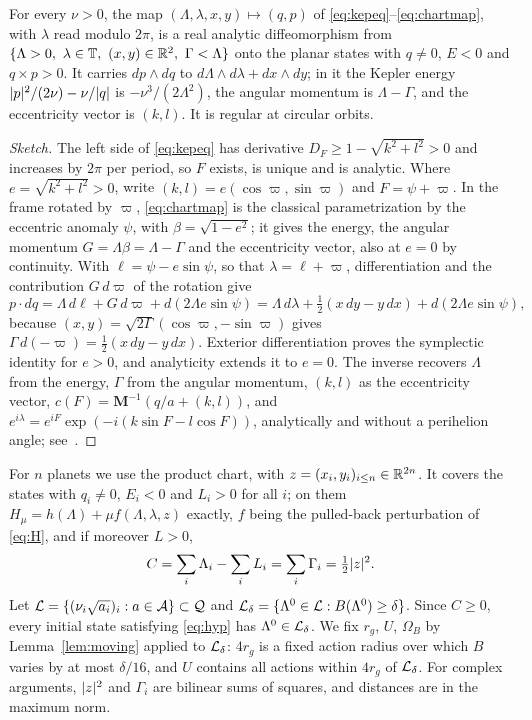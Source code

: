 \begin{lemma}
\label{lem:chart}
For every $\nu>0$, the map $(\Lambda,\lambda,x,y)\mapsto(q,p)$ of \eqref{eq:kepeq}--\eqref{eq:chartmap}, with $\lambda$ read modulo $2\pi$, is a real analytic diffeomorphism from $\{\Lambda>0,\ \lambda\in\T,\ (x,y)\in\R^2,\ \Gamma<\Lambda\}$ onto the planar states with $q\ne0$, $E<0$ and $q\times p>0$. It carries $dp\wedge dq$ to $d\Lambda\wedge d\lambda+dx\wedge dy$; in it the Kepler energy $\lvert p\rvert^2/(2\nu)-\nu/\lvert q\rvert$ is $-\nu^3/(2\Lambda^2)$, the angular momentum is $\Lambda-\Gamma$, and the eccentricity vector is $(k,l)$. It is regular at circular orbits.
\end{lemma}

\begin{proof}[Sketch]
The left side of \eqref{eq:kepeq} has derivative $D_F\ge1-\sqrt{k^2+l^2}>0$ and increases by $2\pi$ per period, so $F$ exists, is unique and is analytic. Where $e=\sqrt{k^2+l^2}>0$, write $(k,l)=e(\cos\varpi,\sin\varpi)$ and $F=\psi+\varpi$. In the frame rotated by $\varpi$, \eqref{eq:chartmap} is the classical parametrization by the eccentric anomaly $\psi$, with $\beta=\sqrt{1-e^2}$; it gives the energy, the angular momentum $G=\Lambda\beta=\Lambda-\Gamma$ and the eccentricity vector, also at $e=0$ by continuity. With $\ell=\psi-e\sin\psi$, so that $\lambda=\ell+\varpi$, differentiation and the contribution $G\,d\varpi$ of the rotation give
\[
p\cdot dq=\Lambda\,d\ell+G\,d\varpi+d(2\Lambda e\sin\psi)=\Lambda\,d\lambda+\tfrac12(x\,dy-y\,dx)+d(2\Lambda e\sin\psi),
\]
because $(x,y)=\sqrt{2\Gamma}(\cos\varpi,-\sin\varpi)$ gives $\Gamma\,d(-\varpi)=\frac12(x\,dy-y\,dx)$. Exterior differentiation proves the symplectic identity for $e>0$, and analyticity extends it to $e=0$. The inverse recovers $\Lambda$ from the energy, $\Gamma$ from the angular momentum, $(k,l)$ as the eccentricity vector, $c(F)=\mathbf M^{-1}(q/a+(k,l))$, and $e^{i\lambda}=e^{iF}\exp(-i(k\sin F-l\cos F))$, analytically and without a perihelion angle; see~\cite{KAMnotes}.
\end{proof}

For $n$ planets we use the product chart, with $z=(x_i,y_i)_{i\le n}\in\mathbb{R}^{2n}$. It covers the states with $q_i\ne0$, $E_i<0$ and $L_i>0$ for all $i$; on them $H_\mu=h(\Lambda)+\mu f(\Lambda,\lambda,z)$ exactly, $f$ being the pulled-back perturbation of \eqref{eq:H}, and if moreover $L>0$,
\begin{equation}
\label{eq:Cz}
C=\sum_i\Lambda_i-\sum_iL_i=\sum_i\Gamma_i=\tfrac12\lvert z\rvert^2.
\end{equation}
Let $\mathcal{L}=\{(\nu_i\sqrt{a_i})_i:a\in\mathcal{A}\}\subset\mathcal{Q}$ and $\mathcal{L}_\delta=\{\Lambda^0\in\mathcal{L}:B(\Lambda^0)\ge\delta\}$. Since $C\ge0$, every initial state satisfying \eqref{eq:hyp} has $\Lambda^0\in\mathcal{L}_\delta$. We fix $r_g$, $U$, $\Omega_B$ by Lemma~\ref{lem:moving} applied to $\mathcal{L}_\delta$: $4r_g$ is a fixed action radius over which $B$ varies by at most $\delta/16$, and $U$ contains all actions within $4r_g$ of $\mathcal{L}_\delta$. For complex arguments, $\lvert z\rvert^2$ and $\Gamma_i$ are bilinear sums of squares, and distances are in the maximum norm.

